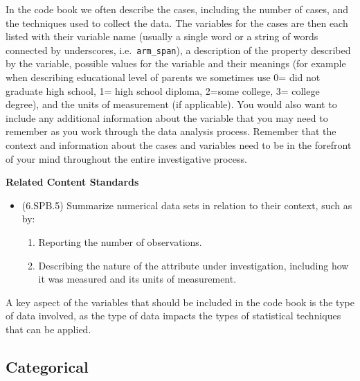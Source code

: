 \documentclass[
]{book}
\providecommand{\tightlist}{%
  \setlength{\itemsep}{0pt}\setlength{\parskip}{0pt}}
\newenvironment{standards}{}{}
\theoremstyle{definition}
\theoremstyle{definition}
\theoremstyle{definition}
\theoremstyle{definition}
\theoremstyle{remark}
\begin{document}
In the code book we often describe the cases, including the number of cases, and the techniques used to collect the data. The variables for the cases are then each listed with their variable name (usually a single word or a string of words connected by underscores, i.e.~\texttt{arm\_span}), a description of the property described by the variable, possible values for the variable and their meanings (for example when describing educational level of parents we sometimes use 0= did not graduate high school, 1= high school diploma, 2=some college, 3= college degree), and the units of measurement (if applicable). You would also want to include any additional information about the variable that you may need to remember as you work through the data analysis process. Remember that the context and information about the cases and variables need to be in the forefront of your mind throughout the entire investigative process.

\begin{standards}

\begin{center}
\textbf{Related Content Standards}

\end{center}

\begin{itemize}
\item
  (6.SPB.5) Summarize numerical data sets in relation to their context, such as by:

  \begin{enumerate}
  \def\labelenumi{\alph{enumi}.}
  \tightlist
  \item
    Reporting the number of observations.
  \item
    Describing the nature of the attribute under investigation, including how it was measured and its units of measurement.
  \end{enumerate}
\end{itemize}

\end{standards}

A key aspect of the variables that should be included in the code book is the type of data involved, as the type of data impacts the types of statistical techniques that can be applied.

\hypertarget{categorical}{%
\subsection{Categorical}\label{categorical}}
\end{document}
